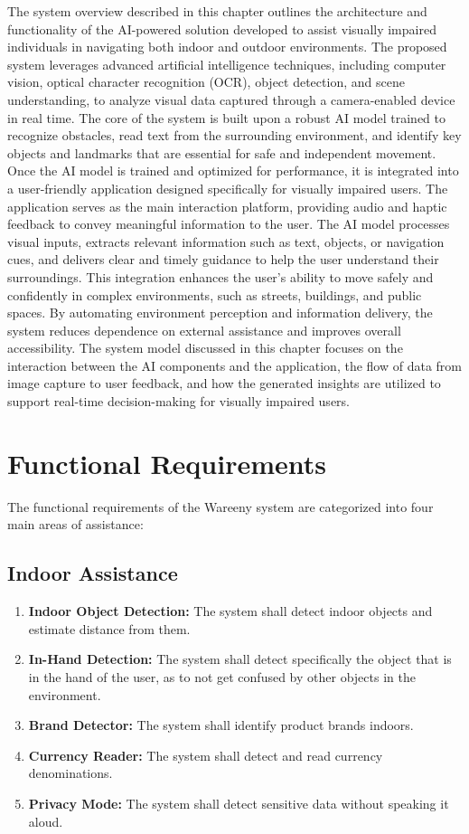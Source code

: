 \documentclass[a4paper]{report}
\begin{document}
The system overview described in this chapter outlines the architecture and functionality of the AI-powered solution developed to assist visually impaired individuals in navigating both indoor and outdoor environments. The proposed system leverages advanced artificial intelligence techniques, including computer vision, optical character recognition (OCR), object detection, and scene understanding, to analyze visual data captured through a camera-enabled device in real time. The core of the system is built upon a robust AI model trained to recognize obstacles, read text from the surrounding environment, and identify key objects and landmarks that are essential for safe and independent movement. Once the AI model is trained and optimized for performance, it is integrated into a user-friendly application designed specifically for visually impaired users. The application serves as the main interaction platform, providing audio and haptic feedback to convey meaningful information to the user. The AI model processes visual inputs, extracts relevant information such as text, objects, or navigation cues, and delivers clear and timely guidance to help the user understand their surroundings. This integration enhances the user's ability to move safely and confidently in complex environments, such as streets, buildings, and public spaces. By automating environment perception and information delivery, the system reduces dependence on external assistance and improves overall accessibility. The system model discussed in this chapter focuses on the interaction between the AI components and the application, the flow of data from image capture to user feedback, and how the generated insights are utilized to support real-time decision-making for visually impaired users.

\section{Functional Requirements}

The functional requirements of the Wareeny system are categorized into four main areas of assistance:

\subsection{Indoor Assistance}

\begin{enumerate}[label=FR-IN-\arabic*:]
    \item \textbf{Indoor Object Detection:} The system shall detect indoor objects and estimate distance from them.
    \item \textbf{In-Hand Detection:} The system shall detect specifically the object that is in the hand of the user, as to not get confused by other objects in the environment.
    \item \textbf{Brand Detector:} The system shall identify product brands indoors.
    \item \textbf{Currency Reader:} The system shall detect and read currency denominations.
    \item \textbf{Privacy Mode:} The system shall detect sensitive data without speaking it aloud.
\end{enumerate}
\end{document}
